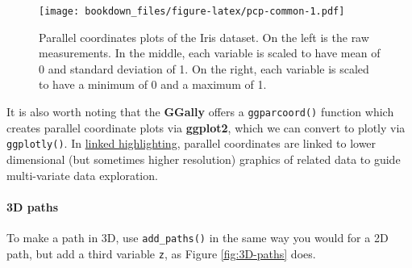\documentclass[12pt,]{isuthesis}
\newenvironment{Shaded}{\begin{snugshade}}{\end{snugshade}}
\newcommand{\KeywordTok}[1]{\textcolor[rgb]{0.13,0.29,0.53}{\textbf{{#1}}}}
\newcommand{\DataTypeTok}[1]{\textcolor[rgb]{0.13,0.29,0.53}{{#1}}}
\newcommand{\FloatTok}[1]{\textcolor[rgb]{0.00,0.00,0.81}{{#1}}}
\newcommand{\StringTok}[1]{\textcolor[rgb]{0.31,0.60,0.02}{{#1}}}
\newcommand{\NormalTok}[1]{{#1}}
\let\oldparagraph\paragraph
\renewcommand{\paragraph}[1]{\oldparagraph{#1}\mbox{}}
\begin{document}
\begin{Shaded}
\end{Shaded}

\begin{figure}[htbp]
\centering
\texttt{[image: bookdown\_files/figure-latex/pcp-common-1.pdf]}
\caption{\label{fig:pcp-common}Parallel coordinates plots of the Iris
dataset. On the left is the raw measurements. In the middle, each
variable is scaled to have mean of 0 and standard deviation of 1. On the
right, each variable is scaled to have a minimum of 0 and a maximum of
1.}
\end{figure}

It is also worth noting that the \textbf{GGally} offers a
\texttt{ggparcoord()} function which creates parallel coordinate plots
via \textbf{ggplot2}, which we can convert to plotly via
\texttt{ggplotly()}. In \protect\hyperlink{linked-highlighting}{linked
highlighting}, parallel coordinates are linked to lower dimensional (but
sometimes higher resolution) graphics of related data to guide
multi-variate data exploration.

\paragraph{3D paths}\label{d-paths}

To make a path in 3D, use \texttt{add\_paths()} in the same way you
would for a 2D path, but add a third variable \texttt{z}, as Figure
\ref{fig:3D-paths} does.
\end{document}
